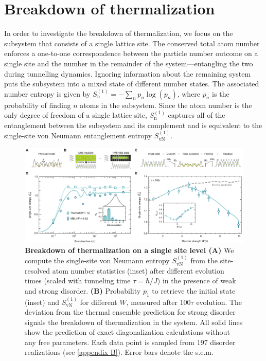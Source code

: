 \section{Breakdown of thermalization}

In order to investigate the breakdown of thermalization, we focus on the subsystem that consists of a single lattice site. The conserved total atom number enforces a one-to-one correspondence between the particle number outcome on a single site and the number in the remainder of the system---entangling the two during tunnelling dynamics. Ignoring information about the remaining system puts the subsystem into a mixed state of different number states. The associated number entropy is given by $S_\text{n}^{(1)} = -\sum_{n} p_n \log(p_n)$, where $p_n$ is the probability of finding $n$ atoms in the subsystem. Since the atom number is the only degree of freedom of a single lattice site, $S_\text{n}^{(1)}$ captures all of the entanglement between the subsystem and its complement and is equivalent to the single-site von Neumann entanglement entropy $S_\text{vN}^{(1)}$.

\begin{figure}[t]
	\centering
	\includegraphics[width=\textwidth]{figures/MBL_ETH_breakdown.pdf}
	{\caption{{\bf Breakdown of thermalization on a single site level (A)} We compute the single-site von Neumann entropy $S_\text{vN}^{(1)}$ from the site-resolved atom number statistics (inset) after different evolution times (scaled with tunneling time $\tau=\hbar/J$) in the presence of weak and strong disorder. {\bf(B)} Probability $p_1$ to retrieve the initial state (inset) and $S_\text{vN}^{(1)}$ for different $W$, measured after $100\tau$ evolution. The deviation from the thermal ensemble prediction for strong disorder signals the breakdown of thermalization in the system. All solid lines show the prediction of exact diagonalization calculations without any free parameters. Each data point is sampled from 197 disorder realizations (see \ref{appendix B}). Error bars denote the s.e.m.}
	\label{fig:MBL_ETH_breakdown}}
\end{figure}

